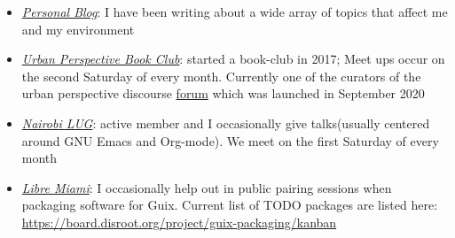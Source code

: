 \documentclass[margin, line]{res} %
\begin{document}
    \begin{itemize}
    \item \href{https://bonfacemunyoki.com}{\textit{Personal Blog}}: I
      have been writing about a wide array of topics that affect me
      and my environment
    \item \href{https://upbookclub.com/}{\textit{Urban Perspective
        Book Club}}: started a book-club in 2017; Meet ups occur on
      the second Saturday of every month. Currently one of the
      curators of the urban perspective discourse
      \href{https://upbookclub.com}{forum} which was launched in
      September 2020
    \item \href{https://nairobilug.or.ke/}{\textit{Nairobi LUG}}:
      active member and I occasionally give talks(usually centered
      around GNU Emacs and Org-mode). We meet on the first Saturday of
      every month
    \item \href{https://libremiami.org/}{\textit{Libre Miami}}: I
      occasionally help out in public pairing sessions when packaging
      software for Guix. Current list of TODO packages are listed
      here:
      \url{https://board.disroot.org/project/guix-packaging/kanban}
    \end{itemize}

\end{document}
